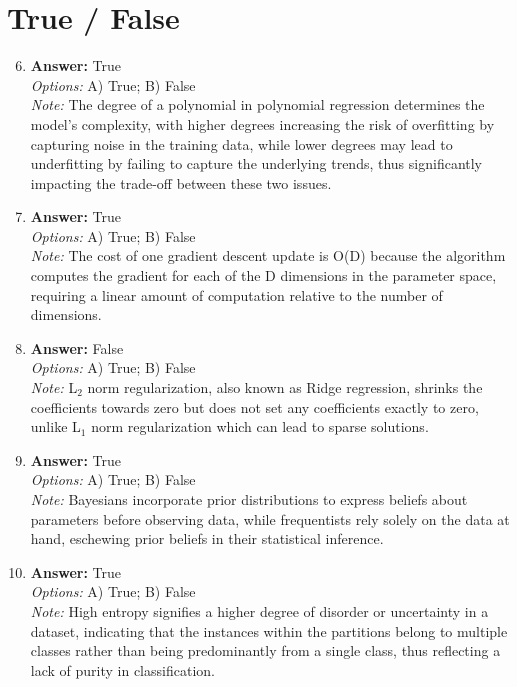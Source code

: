 \documentclass[12pt]{article}
\begin{document}
\section*{True / False}
\begin{enumerate}[label=\arabic*.]
\setcounter{enumi}{5}
\item \textbf{Answer:} True
\\ \textit{Options:} A) True; B) False
\\ \textit{Note:} The degree of a polynomial in polynomial regression determines the model's complexity, with higher degrees increasing the risk of overfitting by capturing noise in the training data, while lower degrees may lead to underfitting by failing to capture the underlying trends, thus significantly impacting the trade-off between these two issues.
\item \textbf{Answer:} True
\\ \textit{Options:} A) True; B) False
\\ \textit{Note:} The cost of one gradient descent update is O(D) because the algorithm computes the gradient for each of the D dimensions in the parameter space, requiring a linear amount of computation relative to the number of dimensions.
\item \textbf{Answer:} False
\\ \textit{Options:} A) True; B) False
\\ \textit{Note:} L$_{2}$ norm regularization, also known as Ridge regression, shrinks the coefficients towards zero but does not set any coefficients exactly to zero, unlike L$_{1}$ norm regularization which can lead to sparse solutions.
\item \textbf{Answer:} True
\\ \textit{Options:} A) True; B) False
\\ \textit{Note:} Bayesians incorporate prior distributions to express beliefs about parameters before observing data, while frequentists rely solely on the data at hand, eschewing prior beliefs in their statistical inference.
\item \textbf{Answer:} True
\\ \textit{Options:} A) True; B) False
\\ \textit{Note:} High entropy signifies a higher degree of disorder or uncertainty in a dataset, indicating that the instances within the partitions belong to multiple classes rather than being predominantly from a single class, thus reflecting a lack of purity in classification.
\end{enumerate}
\end{document}
